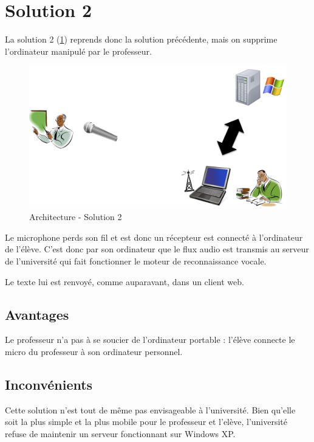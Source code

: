 \section{Solution 2}

La solution 2 (\ref{fig:solution2}) reprends donc la solution précédente, mais on supprime l'ordinateur manipulé par le professeur.

\begin{figure}[h]
 \centering
 \includegraphics[scale=0.5]{./img/solution2.png}
 \caption{Architecture - Solution 2}
 \label{fig:solution2}
\end{figure}

Le microphone perds son fil et est donc un récepteur est connecté à l'ordinateur de l'élève.
C'est donc par son ordinateur que le flux audio est transmis au serveur de l'université qui fait fonctionner le moteur de reconnaissance vocale.

Le texte lui est renvoyé, comme auparavant, dans un client web.

\subsection{Avantages}
Le professeur n'a pas à se soucier de l'ordinateur portable : l'élève connecte le micro du professeur à son ordinateur personnel.

\subsection{Inconvénients}
Cette solution n'est tout de même pas envisageable à l'université. Bien qu'elle soit la plus simple et la plus mobile pour le professeur et l'elève, l'université refuse de maintenir un serveur fonctionnant sur Windows XP.


